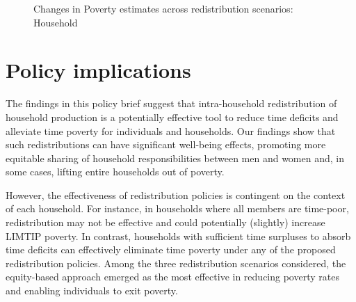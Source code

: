 \documentclass[
  11pt,
]{article}
\begin{document}
\begin{figure}[H]


\caption{\label{fig-limtip1}Changes in Poverty estimates across
redistribution scenarios: Household}

\end{figure}%

\section{Policy implications}\label{policy-implications}

The findings in this policy brief suggest that intra-household
redistribution of household production is a potentially effective tool
to reduce time deficits and alleviate time poverty for individuals and
households. Our findings show that such redistributions can have
significant well-being effects, promoting more equitable sharing of
household responsibilities between men and women and, in some cases,
lifting entire households out of poverty.

However, the effectiveness of redistribution policies is contingent on
the context of each household. For instance, in households where all
members are time-poor, redistribution may not be effective and could
potentially (slightly) increase LIMTIP poverty. In contrast, households
with sufficient time surpluses to absorb time deficits can effectively
eliminate time poverty under any of the proposed redistribution
policies. Among the three redistribution scenarios considered, the
equity-based approach emerged as the most effective in reducing poverty
rates and enabling individuals to exit poverty.
\end{document}
